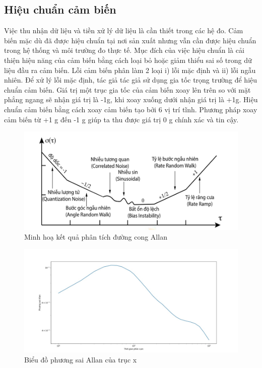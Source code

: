 \subsection{Hiệu chuẩn cảm biến}
Việc thu nhận dữ liệu và tiền xử lý dữ liệu là cần thiết trong các hệ đo. Cảm biến mặc dù đã được hiệu chuẩn tại nơi sản xuất nhưng vẫn cần được hiệu chuẩn trong hệ thống và môi trường đo thực tế. Mục đích của việc hiệu chuẩn là cải thiện hiệu năng của cảm biến bằng cách loại bỏ hoặc giảm thiểu sai số trong dữ liệu đầu ra cảm biến. Lỗi cảm biến phân làm 2 loại i) lỗi mặc định và ii) lỗi ngẫu nhiên. Để xử lý lỗi mặc định, tác giả tác giả sử dụng gia tốc trọng trường để hiệu chuẩn cảm biến. Giá trị một trục gia tốc của cảm biến xoay lên trên so với mặt phẳng ngang sẽ nhận giá trị là -1g, khi xoay xuống dưới nhận giá trị là +1g. Hiệu chuẩn cảm biến bằng cách xoay cảm biến tạo bởi 6 vị trí tĩnh. Phương pháp xoay cảm biến từ +1 g đến -1 g giúp ta thu được giá trị 0 g chính xác và tin cậy.
\begin{figure}[!]
		\centering
 		\includegraphics[width=1\textwidth]{images/allan.png}
		\caption{Minh hoạ kết quả phân tích đường cong Allan}
		\label{allan}
\end{figure}

\begin{figure}[!]
		\centering
 		\includegraphics[width=1\textwidth]{images/allan_real.png}
		\caption{Biểu đồ phương sai Allan của trục x}
		\label{allan_real}
\end{figure}

